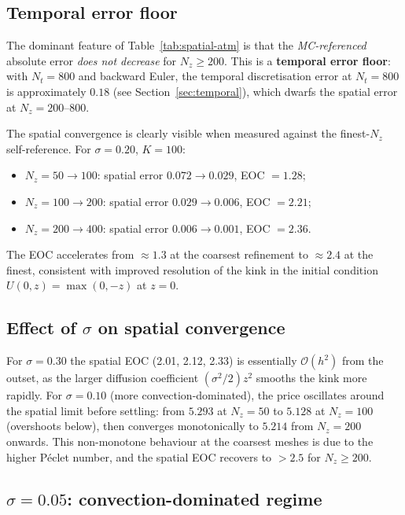 \documentclass[11pt,a4paper]{article}
\newcommand{\Nz}{N_z}
\newcommand{\Nt}{N_t}
\newcommand{\bigo}[1]{\mathcal{O}(#1)}
\begin{document}
\subsection{Temporal error floor}

The dominant feature of Table~\ref{tab:spatial-atm} is that the
\emph{MC-referenced} absolute error \emph{does not decrease} for
$\Nz \ge 200$.  This is a \textbf{temporal error floor}: with
$\Nt = 800$ and backward Euler, the temporal discretisation error
at $\Nt = 800$ is approximately $0.18$ (see Section~\ref{sec:temporal}),
which dwarfs the spatial error at $\Nz = 200$--$800$.

The spatial convergence is clearly visible when measured against the
finest-$\Nz$ self-reference.  For $\sigma = 0.20$, $K = 100$:
\begin{itemize}[noitemsep]
  \item $\Nz = 50 \to 100$: spatial error $0.072 \to 0.029$,
        EOC $= 1.28$;
  \item $\Nz = 100 \to 200$: spatial error $0.029 \to 0.006$,
        EOC $= 2.21$;
  \item $\Nz = 200 \to 400$: spatial error $0.006 \to 0.001$,
        EOC $= 2.36$.
\end{itemize}
The EOC accelerates from $\approx 1.3$ at the coarsest refinement to
$\approx 2.4$ at the finest, consistent with improved resolution of the
kink in the initial condition $U(0, z) = \max(0, -z)$ at $z = 0$.

\subsection{Effect of $\sigma$ on spatial convergence}

For $\sigma = 0.30$ the spatial EOC (2.01, 2.12, 2.33) is essentially
$\bigo{h^2}$ from the outset, as the larger diffusion coefficient
$(\sigma^2/2)z^2$ smooths the kink more rapidly.  For $\sigma = 0.10$
(more convection-dominated), the price oscillates around the spatial
limit before settling: from $5.293$ at $\Nz = 50$ to $5.128$ at
$\Nz = 100$ (overshoots below), then converges monotonically to $5.214$
from $\Nz = 200$ onwards.  This non-monotone behaviour at the coarsest
meshes is due to the higher P\'eclet number, and the spatial EOC
recovers to $> 2.5$ for $\Nz \ge 200$.

\subsection{$\sigma = 0.05$: convection-dominated regime}
\end{document}
